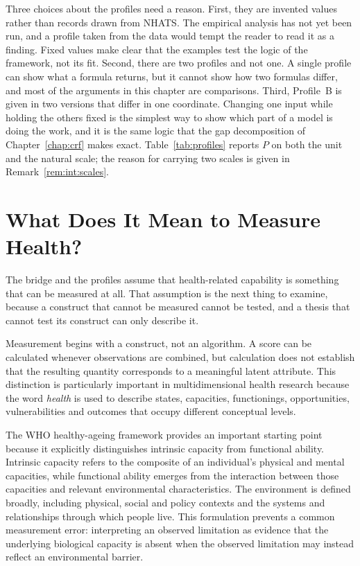 Three choices about the profiles need a reason. First, they are invented values rather than records drawn from NHATS. The empirical analysis has not yet been run, and a profile taken from the data would tempt the reader to read it as a finding. Fixed values make clear that the examples test the logic of the framework, not its fit. Second, there are two profiles and not one. A single profile can show what a formula returns, but it cannot show how two formulas differ, and most of the arguments in this chapter are comparisons. Third, Profile~B is given in two versions that differ in one coordinate. Changing one input while holding the others fixed is the simplest way to show which part of a model is doing the work, and it is the same logic that the gap decomposition of Chapter~\ref{chap:crf} makes exact. Table~\ref{tab:profiles} reports $P$ on both the unit and the natural scale; the reason for carrying two scales is given in Remark~\ref{rem:int:scales}.

\section{What Does It Mean to Measure Health?}
\label{sec:lit-measure}

The bridge and the profiles assume that health-related capability is something that can be measured at all. That assumption is the next thing to examine, because a construct that cannot be measured cannot be tested, and a thesis that cannot test its construct can only describe it.

Measurement begins with a construct, not an algorithm. A score can be calculated whenever observations are combined, but calculation does not establish that the resulting quantity corresponds to a meaningful latent attribute. This distinction is particularly important in multidimensional health research because the word \emph{health} is used to describe states, capacities, functionings, opportunities, vulnerabilities and outcomes that occupy different conceptual levels.

The WHO healthy-ageing framework provides an important starting point because it explicitly distinguishes intrinsic capacity from functional ability. Intrinsic capacity refers to the composite of an individual's physical and mental capacities, while functional ability emerges from the interaction between those capacities and relevant environmental characteristics. The environment is defined broadly, including physical, social and policy contexts and the systems and relationships through which people live. \citep{who_2015_ageing,who_healthy_ageing_2026} This formulation prevents a common measurement error: interpreting an observed limitation as evidence that the underlying biological capacity is absent when the observed limitation may instead reflect an environmental barrier.

